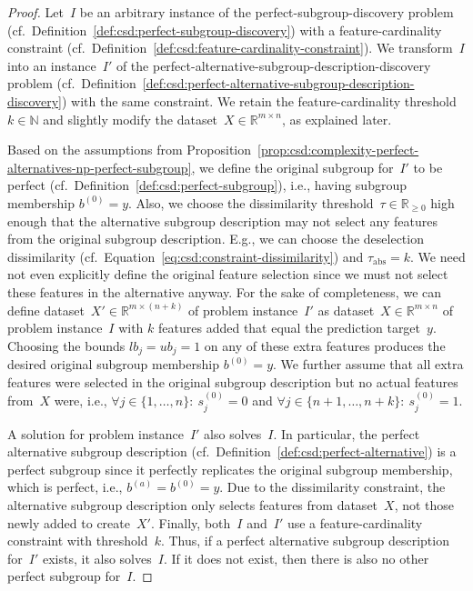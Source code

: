 \begin{proof}
	Let~$I$ be an arbitrary instance of the perfect-subgroup-discovery problem (cf.~Definition~\ref{def:csd:perfect-subgroup-discovery}) with a feature-cardinality constraint (cf.~Definition~\ref{def:csd:feature-cardinality-constraint}).	
	We transform~$I$ into an instance~$I'$ of the perfect-alternative-subgroup-description-discovery problem (cf.~Definition~\ref{def:csd:perfect-alternative-subgroup-description-discovery}) with the same constraint.
	We retain the feature-cardinality threshold~$k \in \mathbb{N}$ and slightly modify the dataset~$X \in \mathbb{R}^{m \times n}$, as explained later.
	
	Based on the assumptions from Proposition~\ref{prop:csd:complexity-perfect-alternatives-np-perfect-subgroup}, we define the original subgroup for~$I'$ to be perfect (cf.~Definition~\ref{def:csd:perfect-subgroup}), i.e., having subgroup membership $b^{(0)} = y$.
	Also, we choose the dissimilarity threshold~$\tau \in \mathbb{R}_{\geq 0}$ high enough that the alternative subgroup description may not select any features from the original subgroup description.
	E.g., we can choose the deselection dissimilarity (cf.~Equation~\ref{eq:csd:constraint-dissimilarity}) and $\tau_{\text{abs}} = k$.
	We need not even explicitly define the original feature selection since we must not select these features in the alternative anyway.
	For the sake of completeness, we can define dataset~$X' \in \mathbb{R}^{m \times (n+k)}$ of problem instance~$I'$ as dataset~$X \in \mathbb{R}^{m \times n}$ of problem instance~$I$ with $k$ features added that equal the prediction target~$y$.
	Choosing the bounds $\mathit{lb}_j = \mathit{ub}_j = 1$ on any of these extra features produces the desired original subgroup membership $b^{(0)} = y$.
	We further assume that all extra features were selected in the original subgroup description but no actual features from~$X$ were, i.e., $\forall j \in \{1, \dots, n\}:~ s^{(0)}_j = 0$ and $\forall j \in \{n+1, \dots, n+k\}:~ s^{(0)}_j = 1$.
	
	A solution for problem instance~$I'$ also solves~$I$.
	In particular, the perfect alternative subgroup description (cf.~Definition~\ref{def:csd:perfect-alternative}) is a perfect subgroup since it perfectly replicates the original subgroup membership, which is perfect, i.e., $b^{(a)} = b^{(0)} = y$.
	Due to the dissimilarity constraint, the alternative subgroup description only selects features from dataset~$X$, not those newly added to create~$X'$.
	Finally, both~$I$ and~$I'$ use a feature-cardinality constraint with threshold~$k$.
	Thus, if a perfect alternative subgroup description for~$I'$ exists, it also solves~$I$.
	If it does not exist, then there is also no other perfect subgroup for~$I$.
	

\end{proof}
